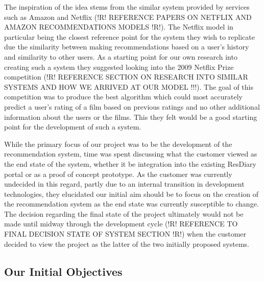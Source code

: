 \documentclass{l3proj}
\begin{document}
The inspiration of the idea stems from the similar system provided by services such as Amazon and Netflix (!R! REFERENCE PAPERS ON NETFLIX AND AMAZON RECOMMENDATIONS MODELS !R!). The Netflix model in particular being the closest reference point for the system they wish to replicate due the similarity between making recommendations based on a user’s history and similarity to other users. As a starting point for our own research into creating such a system they suggested looking into the 2009 Netflix Prize competition (!R! REFERENCE SECTION ON RESEARCH INTO SIMILAR SYSTEMS AND HOW WE ARRIVED AT OUR MODEL !!!). The goal of this competition was to produce the best algorithm which could most accurately predict a user’s rating of a film based on previous ratings and no other additional information about the users or the films. This they felt would be a good starting point for the development of such a system.

While the primary focus of our project was to be the development of the recommendation system, time was spent discussing what the customer viewed as the end state of the system, whether it be integration into the existing ResDiary portal or as a proof of concept prototype. As the customer was currently undecided in this regard, partly due to an internal transition in development technologies, they elucidated our initial aim should be to focus on the creation of the recommendation system as the end state was currently susceptible to change. The decision regarding the final state of the project ultimately would not be made until midway through the development cycle (!R! REFERENCE TO FINAL DECISION STATE OF SYSTEM SECTION !R!) when the customer decided to view the project as the latter of the two initially proposed systems.


\subsection{Our Initial Objectives}
\label{sec:ourinitobjectives}
\end{document}
